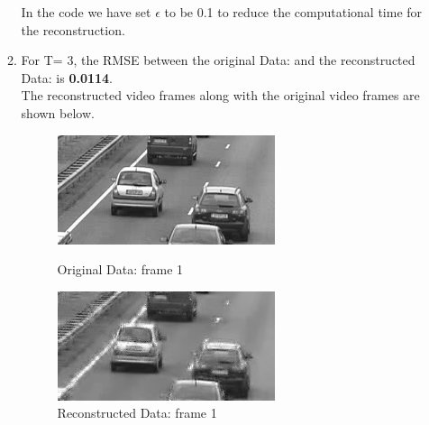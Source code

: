 \documentclass[12pt]{article}
\begin{document}
\begin{itemize}
\begin{enumerate}
    In the code we have set $\epsilon$ to be 0.1 to reduce the computational time for the reconstruction.

    \item For T= 3, the RMSE between the original Data: and the reconstructed Data: is \textbf{0.0114}. \\
    The reconstructed video frames along with the original video frames are shown below.

    \begin{figure}[H]
        \centering
        \begin{minipage}{.45\textwidth}
            \centering
            \includegraphics[width=\linewidth]{results/cars_3_orig_1.png}
            \caption*{Original Data: frame 1}
        \end{minipage}
        \begin{minipage}{.45\textwidth}
            \centering
            \includegraphics[width=\linewidth]{results/cars_3_recon_1.png}
            \caption*{Reconstructed Data: frame 1}
        \end{minipage}
    \end{figure}


\end{enumerate}
\end{itemize}
\end{document}
